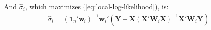 \documentclass[authoryear, review, 11pt]{elsarticle}
\begin{document}
	And $\hat{\sigma}_i$, which maximizes (\ref{eq:local-log-likelihood}), is:
	\begin{eqnarray}
		\hat{\sigma}_i = \left(\bm{1}_n'\bm{w}_i \right)^{-1} \bm{w}_i'\left(\bm{Y}-\bm{X}\left(\bm{X}'\bm{W}_i\bm{X}\right)^{-1}\bm{X}'\bm{W}_i\bm{Y}\right)
	\end{eqnarray}
	

\end{document}
